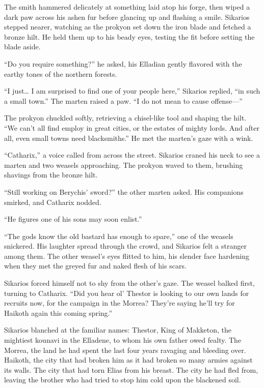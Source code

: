 The smith hammered delicately at something laid atop his forge, then wiped a dark paw across his ashen fur before glancing up and flashing a smile. Sikarios stepped nearer, watching as the prokyon set down the iron blade and fetched a bronze hilt. He held them up to his beady eyes, testing the fit before setting the blade aside.

``Do you require something?'' he asked, his Elladian gently flavored with the earthy tones of the northern forests.

``I just\ldots{} I am surprised to find one of your people here,'' Sikarios replied, ``in such a small town.'' The marten raised a paw. ``I do not mean to cause offense---''

The prokyon chuckled softly, retrieving a chisel-like tool and shaping the hilt. ``We can't all find employ in great cities, or the estates of mighty lords. And after all, even small towns need blacksmiths.'' He met the marten's gaze with a wink.

``Catharix,'' a voice called from across the street. Sikarios craned his neck to see a marten and two weasels approaching. The prokyon waved to them, brushing shavings from the bronze hilt.

``Still working on Berychis' sword?'' the other marten asked. His companions smirked, and Catharix nodded.

``He figures one of his sons may soon enlist.''

``The gods know the old bastard has enough to spare,'' one of the weasels snickered. His laughter spread through the crowd, and Sikarios felt a stranger among them. The other weasel's eyes flitted to him, his slender face hardening when they met the greyed fur and naked flesh of his scars.

Sikarios forced himself not to shy from the other's gaze. The weasel balked first, turning to Catharix. ``Did you hear ol' Thestor is looking to our own lands for recruits now, for the campaign in the Morrea? They're saying he'll try for Haikoth again this coming spring.''

Sikarios blanched at the familiar names: Thestor, King of Makketon, the mightiest kounavi in the Elladene, to whom his own father owed fealty. The Morrea, the land he had spent the last four years ravaging and bleeding over. Haikoth, the city that had broken him as it had broken so many armies against its walls. The city that had torn Elias from his breast. The city he had fled from, leaving the brother who had tried to stop him cold upon the blackened soil.

